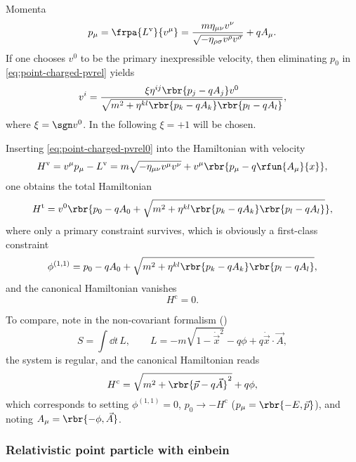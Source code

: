 \documentclass[a4paper,11pt]{article}
\begin{document}
Momenta
\begin{equation}
p_\mu = \frpa{L^\text{v}}{v^\mu} = 
\frac{m\eta_{\mu\nu}v^\nu}{\sqrt{-\eta_{\rho\sigma}v^\rho v^\sigma}} + q A_\mu.
\label{eq:point-charged-pvrel}
\end{equation}
If one chooses $v^0$ to be the primary inexpressible velocity, then eliminating
$p_0$ in \cref{eq:point-charged-pvrel} yields
\begin{equation}
v^i = \frac{\xi \eta^{ij} \rbr{p_j - q A_j} v^0}{\sqrt{m^2 + \eta^{kl}
\rbr{p_k - q A_k}\rbr{p_l - q A_l}}},
\label{eq:point-charged-pvrel0}
\end{equation}
where $\xi = \sgn v^0$. In the following $\xi = +1$ will be chosen.

Inserting \cref{eq:point-charged-pvrel0} into the Hamiltonian with velocity
\begin{equation}
H^\text{v} = v^\mu p_\mu - L^\text{v} = m\sqrt{-\eta_{\mu\nu}v^\mu v^\nu} + 
v^\mu\rbr{p_\mu - q \rfun{A_\mu}{x}},
\end{equation}
one obtains the total Hamiltonian
\begin{equation}
H^\text{t} = v^0 \rbr{p_0 - q A_0 + \sqrt{m^2 + \eta^{kl}
\rbr{p_k - q A_k}\rbr{p_l - q A_l}}},
\end{equation}
where only a primary constraint survives, which is obviously a first-class 
constraint
\begin{equation}
\phi^{(1,1)} = p_0 - q A_0 + \sqrt{m^2 + \eta^{kl}
\rbr{p_k - q A_k}\rbr{p_l - q A_l}},
\end{equation}
and the canonical Hamiltonian vanishes
\begin{equation}
H^\text{c} = 0.
\end{equation}

To compare, note in the non-covariant formalism (\cite[sec.\ 8]{Landau1975})
\begin{equation}
S = \int \dd t\,L,\qquad L = -m\sqrt{1-\dot{\vec{x}}^2} - q \phi +
q \dot{\vec{x}} \cdot \vec{A},
\end{equation}
the system is regular, and the canonical Hamiltonian reads
\begin{equation}
H^\text{c} = \sqrt{m^2 + \rbr{\vec{p}-q\vec{A}}^2} + q\phi,
\end{equation}
which corresponds to setting $\phi^{(1,1)} = 0$, $p_0 \to -H^\text{c}$ 
($p_\mu = \rbr{-E, \vec{p}}$), and noting $A_\mu = \rbr{-\phi, \vec{A}}$.

\subsubsection*{Relativistic point particle with einbein}
\end{document}

